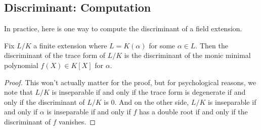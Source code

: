 \subsection{Discriminant: Computation}
In practice, here is one way to compute the discriminant of a field extension.
\begin{prop}
	Fix $L/K$ a finite extension where $L=K(\alpha)$ for some $\alpha\in L.$ Then the discriminant of the trace form of $L/K$ is the discriminant of the monic minimal polynomial $f(X)\in K[X]$ for $\alpha.$
\end{prop}
\begin{proof}
	This won't actually matter for the proof, but for psychological reasons, we note that $L/K$ is inseparable if and only if the trace form is degenerate if and only if the discriminant of $L/K$ is $0.$ And on the other side, $L/K$ is inseparable if and only if $\alpha$ is inseparable if and only if $f$ has a double root if and only if the discriminant of $f$ vanishes.
	

\end{proof}
